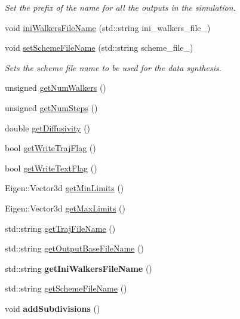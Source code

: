 \begin{DoxyCompactItemize}
\begin{DoxyCompactList}\small\item\em Set the prefix of the name for all the outputs in the simulation. \end{DoxyCompactList}\item 
void \hyperlink{class_parameters_a73d64bb093a93c2b806883f5504d8fb5}{ini\+Walkers\+File\+Name} (std\+::string ini\+\_\+walkers\+\_\+file\+\_\+)
\item 
void \hyperlink{class_parameters_a95ca6c28a5c87363460ca48eed5f065f}{set\+Scheme\+File\+Name} (std\+::string scheme\+\_\+file\+\_\+)
\begin{DoxyCompactList}\small\item\em Sets the scheme file name to be used for the data synthesis. \end{DoxyCompactList}\item 
unsigned \hyperlink{class_parameters_adb8599bc60f977f684f32a83bbe28fc1}{get\+Num\+Walkers} ()
\item 
unsigned \hyperlink{class_parameters_aa5aaf80e0189c63090e8f04cf485800f}{get\+Num\+Steps} ()
\item 
double \hyperlink{class_parameters_ac429071159941e3957eb7c030280a30f}{get\+Diffusivity} ()
\item 
bool \hyperlink{class_parameters_a21817e9a0207da2adf32611bcaf889ef}{get\+Write\+Traj\+Flag} ()
\item 
bool \hyperlink{class_parameters_adb6064f329732640c226608d6e1ddb60}{get\+Write\+Text\+Flag} ()
\item 
Eigen\+::\+Vector3d \hyperlink{class_parameters_abda8b91e5ac40e67c79184d7071c353a}{get\+Min\+Limits} ()
\item 
Eigen\+::\+Vector3d \hyperlink{class_parameters_ad4f8b826db4c1b665891740469e41086}{get\+Max\+Limits} ()
\item 
std\+::string \hyperlink{class_parameters_a38057c2ae3d11b578c8f199d73683ee1}{get\+Traj\+File\+Name} ()
\item 
std\+::string \hyperlink{class_parameters_a794fd941bf5ff311f61f2e6b4f19e64d}{get\+Output\+Base\+File\+Name} ()
\item 
\mbox{\label{class_parameters_af734dc58d8d5898049226614c2dd38a3}} 
std\+::string {\bfseries get\+Ini\+Walkers\+File\+Name} ()
\item 
std\+::string \hyperlink{class_parameters_a7291b970983c021569cd2e3a0573592c}{get\+Scheme\+File\+Name} ()
\item 
\mbox{\label{class_parameters_ae5fa10ca3ccc20d9b51a2bc549daf1c3}} 
void {\bfseries add\+Subdivisions} ()
\end{DoxyCompactItemize}
